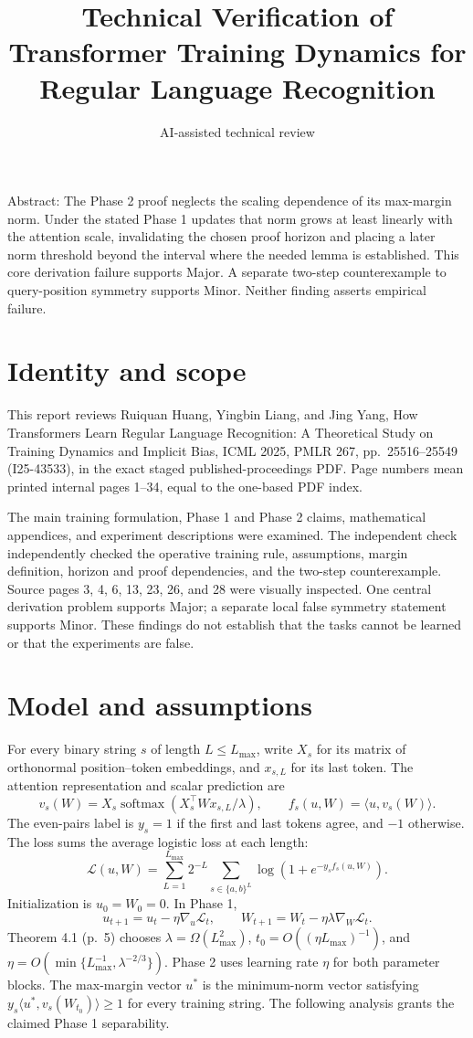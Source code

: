 \documentclass[10pt]{article}
\title{Technical Verification of Transformer Training Dynamics for Regular Language Recognition}
\author{AI-assisted technical review}
\date{}
\begin{document}
\maketitle
Abstract: The Phase 2 proof neglects the scaling dependence of its max-margin norm. Under the stated Phase 1 updates that norm grows at least linearly with the attention scale, invalidating the chosen proof horizon and placing a later norm threshold beyond the interval where the needed lemma is established. This core derivation failure supports Major. A separate two-step counterexample to query-position symmetry supports Minor. Neither finding asserts empirical failure.\par
\section*{Identity and scope}
This report reviews Ruiquan Huang, Yingbin Liang, and Jing Yang, How Transformers Learn Regular Language Recognition: A Theoretical Study on Training Dynamics and Implicit Bias, ICML 2025, PMLR 267, pp. 25516–25549 (I25-43533), in the exact staged published-proceedings PDF. Page numbers mean printed internal pages 1–34, equal to the one-based PDF index.\par
The main training formulation, Phase 1 and Phase 2 claims, mathematical appendices, and experiment descriptions were examined. The independent check independently checked the operative training rule, assumptions, margin definition, horizon and proof dependencies, and the two-step counterexample. Source pages 3, 4, 6, 13, 23, 26, and 28 were visually inspected. One central derivation problem supports Major; a separate local false symmetry statement supports Minor. These findings do not establish that the tasks cannot be learned or that the experiments are false.\par
\section*{Model and assumptions}
For every binary string \(s\) of length \(L\le L_{\max}\), write \(X_s\) for its matrix of orthonormal position–token embeddings, and \(x_{s,L}\) for its last token. The attention representation and scalar prediction are \[v_s(W)=X_s\operatorname{softmax}(X_s^\top W x_{s,L}/\lambda),
\qquad f_s(u,W)=\langle u,v_s(W)\rangle.\] The even-pairs label is \(y_s=1\) if the first and last tokens agree, and \(-1\) otherwise. The loss sums the average logistic loss at each length: \[\mathcal L(u,W)=\sum_{L=1}^{L_{\max}}2^{-L}
\sum_{s\in\{a,b\}^L}\log(1+e^{-y_sf_s(u,W)}).\] Initialization is \(u_0=W_0=0\). In Phase 1, \[u_{t+1}=u_t-\eta\nabla_u\mathcal L_t,\qquad
W_{t+1}=W_t-\eta\lambda\nabla_W\mathcal L_t.\] Theorem 4.1 (p. 5) chooses \(\lambda=\Omega(L_{\max}^2)\), \(t_0=O((\eta L_{\max})^{-1})\), and \(\eta=O(\min\{L_{\max}^{-1},\lambda^{-2/3}\})\). Phase 2 uses learning rate \(\eta\) for both parameter blocks. The max-margin vector \(u^\ast\) is the minimum-norm vector satisfying \(y_s\langle u^\ast,v_s(W_{t_0})\rangle\ge1\) for every training string. The following analysis grants the claimed Phase 1 separability.\par
\end{document}
